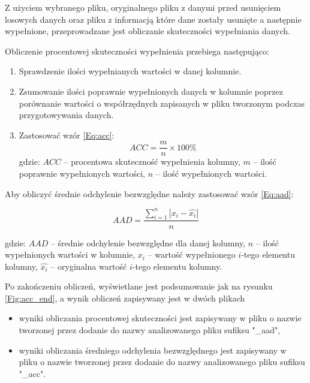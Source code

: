 \documentclass[12pt,twoside]{article}
\begin{document}
Z użyciem wybranego pliku, oryginalnego pliku z danymi przed usunięciem losowych danych
oraz pliku z informacją które dane zostały usunięte a następnie wypełnione,
przeprowadzane jest obliczanie skuteczności wypełniania danych.

Obliczenie procentowej skuteczności wypełnienia przebiega następująco:

\begin{enumerate}[label=\arabic*), leftmargin=1.25cm]
    \item Sprawdzenie ilości wypełnianych wartości w danej kolumnie.
    \item Zsumowanie ilości poprawnie wypełnionych danych w kolumnie poprzez porównanie wartości o współrzędnych
    zapisanych w pliku tworzonym podczas przygotowywania danych.
    \item Zastosować wzór \ref{Eq:acc}:
        \begin{equation}
        ACC=\frac{m}{n}\times100\%
        \label{Eq:acc}
        \end{equation}
    gdzie: $ACC$ -- procentowa skuteczność wypełnienia kolumny,
    $m$ -- ilość poprawnie wypełnionych wartości,
    $n$ -- ilość wypełnionych wartości.
\end{enumerate}

Aby obliczyć średnie odchylenie bezwzględne należy zastosować wzór \ref{Eq:aad}:

    \begin{equation}
    AAD=\frac{\sum_{i=1}^{n}|x_i - \hat{x_i}|}{n}
    \label{Eq:aad}
    \end{equation}

gdzie: $AAD$ -- średnie odchylenie bezwzględne dla danej kolumny,
$n$ -- ilość wypełnionych wartości w kolumnie,
$x_i$ -- wartość wypełnionego $i$-tego elementu kolumny,
$\hat{x_i}$ -- oryginalna wartość $i$-tego elementu kolumny.

Po zakończeniu obliczeń, wyświetlane jest podsumowanie jak na rysunku \ref{Fig:acc_end},
a wynik obliczeń zapisywany jest w dwóch plikach

\begin{itemize}[label=-,labelsep=0.4cm, leftmargin=1.25cm]
    \item wyniki obliczania procentowej skuteczności jest zapisywany w pliku o nazwie
    tworzonej przez dodanie do nazwy analizowanego pliku sufiksu "\_aad",
    \item wyniki obliczania średniego odchylenia bezwzględnego jest zapisywany w pliku o nazwie
    tworzonej przez dodanie do nazwy analizowanego pliku sufiksu "\_acc".
\end{itemize}
\end{document}
